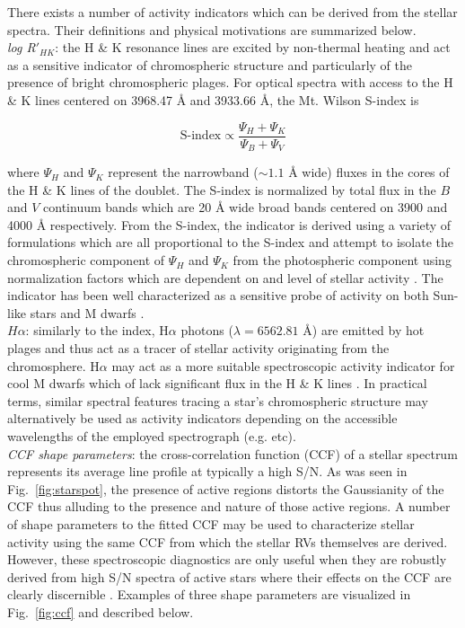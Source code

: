 There exists a number of activity indicators which can be derived from the stellar
spectra. Their definitions and physical motivations are summarized below. \\

\emph{log R$'_{HK}$}:
the \caii{} H \& K resonance lines are excited by non-thermal heating 
and act as a sensitive indicator of chromospheric structure and particularly of
the presence of bright chromospheric plages. 
For optical spectra with access to the \caii{} H \& K lines
centered on 3968.47 \AA{} and 3933.66 \AA{,} the Mt. Wilson S-index is

\begin{equation}
  \text{S-index} \propto \frac{\Psi_H + \Psi_K}{\Psi_B + \Psi_V}
\end{equation}

\noindent where $\Psi_H$ and $\Psi_K$ represent the narrowband
($\sim 1.1$ \AA{} wide) fluxes in the cores of the H \& K lines of the \caii{}
doublet. The S-index is normalized by total flux in the $B$ and $V$ continuum bands
which are 20 \AA{} wide broad bands centered on 3900 and 4000 \AA{} respectively.
From the S-index, the \Rhk{} indicator is derived using a variety of formulations which are
all proportional to the S-index and attempt to isolate the chromospheric component of
$\Psi_H$ and $\Psi_K$ from the photospheric component using normalization factors
which are dependent on \teff{} and level of stellar activity \citep{lovis11}. The
\Rhk{} indicator has been well characterized as a sensitive probe of activity on
both Sun-like stars and M dwarfs
\citep[e.g.][]{wright04,lovis11,astudillodefru17b}. \\

$H\alpha$: 
similarly to the \Rhk{} index, H$\alpha$ photons ($\lambda = 6562.81$ \AA{)} are emitted by
hot plages and thus act as a tracer of stellar activity originating from the chromosphere.
H$\alpha$ may act as a more suitable spectroscopic activity indicator for cool M dwarfs
which of lack significant flux in the \caii{} H \& K lines \citep{robertson14}.
In practical terms,  
similar spectral features tracing a star's chromospheric structure may alternatively be used
as activity indicators depending on the accessible wavelengths of the employed spectrograph
(e.g. \hei{,} \nai{,} etc). \\


\emph{CCF shape parameters}:
the cross-correlation function (CCF) of a stellar spectrum represents its average line profile
at typically a high S/N.
As was seen in Fig.~\ref{fig:starspot}, the presence of active regions distorts
the Gaussianity of the CCF thus alluding to the presence and nature of those active regions.
A number of shape parameters to the fitted CCF may be used to characterize stellar activity
using the same CCF from which the stellar RVs themselves are derived. However, these
spectroscopic diagnostics are only useful when they are robustly derived from high S/N
spectra of active stars where their effects on the CCF are clearly discernible \citep{desort07}.
Examples of three
shape parameters are visualized in Fig.~\ref{fig:ccf} and described below. \\

